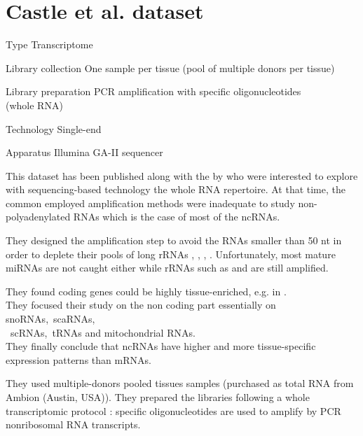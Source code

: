 \section{Castle et al. dataset}
\label{ch:castleData}

\begin{eqlist}
    \item[Type] Transcriptome
    \item[Library collection] One sample per tissue (pool of multiple donors per tissue)
    \item[Library preparation] \gls{PCR} amplification with specific oligonucleotides\\(whole RNA)
    \item[Technology] Single-end
    \item[Apparatus] Illumina GA-II sequencer
\end{eqlist}

This dataset has been published along with the 
    by \citet*{castleData} who were interested to explore
    with sequencing-based technology the whole RNA repertoire. At that time, the common
    employed amplification methods were inadequate to study non-polyadenylated
    \glspl{RNA} which is the case of most of the \glspl{ncRNA}.

    They designed the amplification step to avoid the \glspl{RNA}
    smaller than 50 \gls{nt} in order to deplete their pools of long
    \glspl{rRNA} , , ,
    . Unfortunately, most mature \glspl{miRNA} are not caught
    either while \glspl{rRNA} such as  and  are
    still amplified.

    They found coding genes could be highly tissue-enriched, e.g. 
    in .\\They focused their study on the non coding part essentially
    on \glspl{snoRNA},~\glspl{scaRNA},\\~\glspl{scRNA},~\glspl{tRNA} and mitochondrial
    \glspl{RNA}.\\
    They finally conclude that \glspl{ncRNA} have higher and more tissue-specific
    expression patterns than \glspl{mRNA}.

    They used multiple-donors pooled tissues samples (purchased as total \gls{RNA}
    from Ambion (Austin, USA)).
    They prepared the libraries following a whole transcriptomic protocol \citep{Armour:2009}:
    specific oligonucleotides are used to amplify by \gls{PCR} nonribosomal \gls{RNA}
    transcripts.

